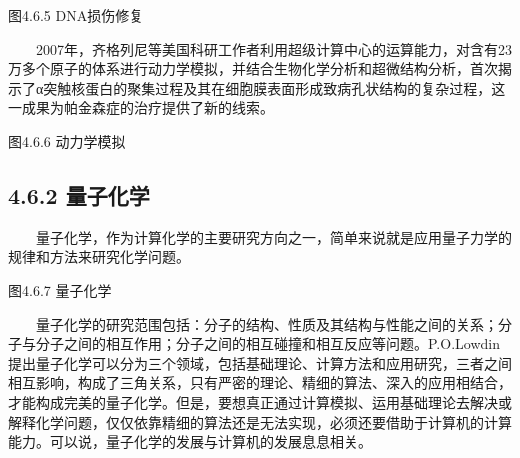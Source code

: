 \documentclass[a4paper,11pt,english]{sphinxmanual}
\begin{document}

\begin{center}图4.6.5 DNA损伤修复
\end{center}
\sphinxAtStartPar
{} 

\sphinxAtStartPar
  2007年，齐格列尼等美国科研工作者利用超级计算中心的运算能力，对含有23万多个原子的体系进行动力学模拟，并结合生物化学分析和超微结构分析，首次揭示了α突触核蛋白的聚集过程及其在细胞膜表面形成致病孔状结构的复杂过程，这一成果为帕金森症的治疗提供了新的线索。


\begin{center}图4.6.6 动力学模拟
\end{center}

\subsection{4.6.2 量子化学}
\label{\detokenize{rst/4.6VQE_u7b97_u6cd5:id2}}
\sphinxAtStartPar
  量子化学，作为计算化学的主要研究方向之一，简单来说就是应用量子力学的规律和方法来研究化学问题。


\begin{center}图4.6.7 量子化学
\end{center}
\sphinxAtStartPar
  量子化学的研究范围包括：分子的结构、性质及其结构与性能之间的关系；分子与分子之间的相互作用；分子之间的相互碰撞和相互反应等问题。P.O.Lowdin提出量子化学可以分为三个领域，包括基础理论、计算方法和应用研究，三者之间相互影响，构成了三角关系，只有严密的理论、精细的算法、深入的应用相结合，才能构成完美的量子化学。但是，要想真正通过计算模拟、运用基础理论去解决或解释化学问题，仅仅依靠精细的算法还是无法实现，必须还要借助于计算机的计算能力。可以说，量子化学的发展与计算机的发展息息相关。

\end{document}
